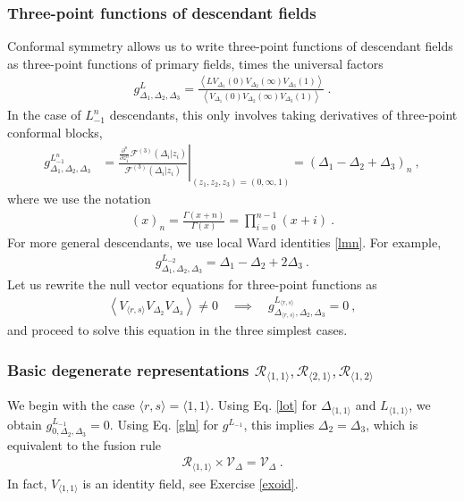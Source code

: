 \documentclass[12pt, a4paper, notitlepage, twoside]{report}
\numberwithin{equation}{section}
\theoremstyle{break}
\begin{document}
\subsubsection{Three-point functions of descendant fields}

Conformal symmetry allows us to write three-point functions of descendant fields as three-point functions of primary fields, times the universal factors
\begin{align}
g^{L}_{\Delta_1,\Delta_2,\Delta_3} = 
 \frac{ \left< L V_{\Delta_1}(0)V_{\Delta_2}(\infty)V_{\Delta_3}(1)\right> }{  \left<  V_{\Delta_1}(0)V_{\Delta_2}(\infty)V_{\Delta_3}(1)\right>}\ .
 \label{glvv}
\end{align}
In the case of $L_{-1}^n$ descendants, this only involves taking derivatives of three-point conformal blocks, 
\begin{align}
 g^{L_{-1}^n}_{\Delta_1,\Delta_2,\Delta_3} & =\left. \frac{\frac{\partial^n}{\partial z_1^n} \mathcal{F}^{(3)}(\Delta_i|z_i)}{\mathcal{F}^{(3)}(\Delta_i|z_i)}\right|_{(z_1,z_2,z_3)=(0,\infty,1)} =(\Delta_1-\Delta_2+\Delta_3)_n \ ,
 \label{gln}
\end{align}
where we use the notation
\begin{align}
 (x)_n = \frac{\Gamma(x+n)}{\Gamma(x)} = \prod_{i=0}^{n-1}(x+i)\ .
\label{xn}
\end{align}
For more general descendants, we use local Ward identities \eqref{lmn}. For example,
\begin{align}
 g^{L_{-2}}_{\Delta_1,\Delta_2,\Delta_3}
 = \Delta_1-\Delta_2+2\Delta_3\ .
 \label{glt}
\end{align}
Let us rewrite the null vector equations for three-point functions as 
\begin{align}
 \left< V_{\langle r,s \rangle} V_{\Delta_2}V_{\Delta_3}\right> \neq 0 \quad \implies \quad 
 g^{L_{\langle r,s\rangle}}_{\Delta_{\langle r,s\rangle},\Delta_2,\Delta_3} = 0\ ,
\end{align}
and proceed to solve this equation in the three simplest cases. 

\subsubsection{Basic degenerate representations $\mathcal{R}_{\langle 1,1 \rangle}, \mathcal{R}_{\langle 2,1 \rangle}, \mathcal{R}_{\langle 1,2 \rangle}$}

We begin with the case $\langle r,s \rangle = \langle 1,1 \rangle$.
Using Eq. \eqref{lot} for $\Delta_{\langle 1,1 \rangle}$ and $L_{\langle 1,1 \rangle}$, we obtain
$g^{L_{-1}}_{0,\Delta_2,\Delta_3} = 0$.
Using Eq. \eqref{gln} for $g^{L_{-1}}$, this implies 
$
 \Delta_2=\Delta_3
$,
which is equivalent to the fusion rule
\begin{align}
 \boxed{\mathcal{R}_{\langle 1,1\rangle} \times \mathcal{V}_\Delta = \mathcal{V}_\Delta} \ .
 \label{roof}
\end{align}
In fact, $V_{\langle 1,1\rangle}$ is an identity field, see Exercise \ref{exoid}.
\end{document}
